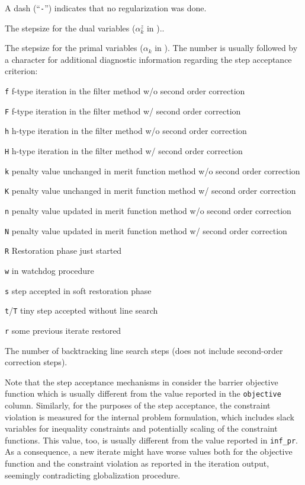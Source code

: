 \begin{description}
A dash (``\texttt{-}'') indicates that no regularization was done.
\item[alpha\_du]
The stepsize for the dual variables ($\alpha^z_k$ in \cite[Eq.~(14c)]{WaBi2006})..
\item[alpha\_pr]
The stepsize for the primal variables ($\alpha_k$ in \cite[Eq.~(14a)]{WaBi2006}).
The number is usually followed by a character for additional diagnostic information regarding the step acceptance criterion:
 \begin{list}{blub}{\itemsep0pt}
    \item[\texttt{f}] f-type iteration in the filter method w/o second order correction
    \item[\texttt{F}] f-type iteration in the filter method w/ second order correction
    \item[\texttt{h}] h-type iteration in the filter method w/o second order correction
    \item[\texttt{H}] h-type iteration in the filter method w/ second order correction
    \item[\texttt{k}] penalty value unchanged in merit function method w/o second order correction
    \item[\texttt{K}] penalty value unchanged in merit function method w/ second order correction
    \item[\texttt{n}] penalty value updated in merit function method w/o second order correction
    \item[\texttt{N}] penalty value updated in merit function method w/ second order correction
    \item[\texttt{R}] Restoration phase just started
    \item[\texttt{w}] in watchdog procedure
    \item[\texttt{s}] step accepted in soft restoration phase
    \item[\texttt{t}/\texttt{T}] tiny step accepted without line search
    \item[\texttt{r}] some previous iterate restored
 \end{list}
\item[ls]
The number of backtracking line search steps (does not include second-order correction steps).
\end{description}

Note that the step acceptance mechanisms in \IPOPT consider the
barrier objective function \cite[Eq.~(3a)]{WaBi2006} which is
usually different from the value reported in the \texttt{objective}
column.  Similarly, for the purposes of the step acceptance, the
constraint violation is measured for the internal problem formulation,
which includes slack variables for inequality constraints and
potentially scaling of the constraint functions.  This value, too, is
usually different from the value reported in \texttt{inf\_pr}.  As a
consequence, a new iterate might have worse values both for the
objective function and the constraint violation as reported in the
iteration output, seemingly contradicting globalization procedure.


